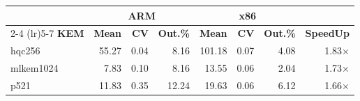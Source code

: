 \begin{table}[!ht]
\begin{tabular}{lrrr|rrr|r}
 \toprule
& \multicolumn{3}{c}{\bfseries ARM} & \multicolumn{3}{c}{\bfseries x86} &\\
\cmidrule(lr){2-4} \cmidrule(lr){5-7}
\textbf{KEM} & \textbf{Mean} & \textbf{CV} & \textbf{Out.\%} & \textbf{Mean} & \textbf{CV} & \textbf{Out.\%} & \textbf{SpeedUp}\\
\midrule
hqc256 & 55.27 & 0.04 & 8.16 & 101.18 & 0.07 & 4.08 & 1.83× \\
mlkem1024 & 7.83 & 0.10 & 8.16 & 13.55 & 0.06 & 2.04 & 1.73× \\
p521 & 11.83 & 0.35 & 12.24 & 19.63 & 0.06 & 6.12 & 1.66× \\
\bottomrule
\end{tabular}
\end{table}
